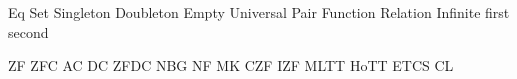 \def\Llam#1#2{\lambda\,{#1}\,.\,{#2}}
\def\Lmac#1{\underline{\mathtt{#1}}}
\def\Lfinto{\rightarrow\mathrel{\kern-.8em}\rightarrow}
\def\Lnum#1{{\underline{#1}}}
\def\lamstep{\mathrel{\;\triangleright_{\kern-.4em}{}_{\phantom{\beta}}\;}}
\def\invstep{\phantom{\lamstep}}
\def\betastep{\mathrel{\;\triangleright_{\kern-.4em{}_\beta}\;}}
\def\etastep{\mathrel{\;\triangleright_{\kern-.4em{}_\eta}\;}}
\def\alphastep{\mathrel{\;\triangleright_{\kern-.4em{}_\alpha}\;}}
\let\lstep=\lamstep
\let\istep=\invstep
\let\bstep=\betastep
\let\estep=\etastep
\let\astep=\alphastep
\def\lameq{\mathrel{\,=\,}}
\def\isteq{\istep\lameq}%
\def\redex#1{\underline{#1}}

\def\C#1{{\mathord{\mathsfmbf{#1}}}}
\def\Cto{\mathrel{\triangleright}}
\def\cI{{\C I}}
\def\cK{{\C K}}
\def\cM{{\C M}}
\def\cC{{\C C}}
\def\cS{{\C S}}
\def\cW{{\C W}}
\def\cB{{\C B}}
\def\cR{{\C R}}
\def\cV{{\C V}}
\def\cBp{{{\C B}'}}

\let\knuthsetminus=\setminus
\def\setminus{\mathbin{\knuthsetminus}}
\def\cantorcard#1{\overline{\overline{#1}}}
\def\cantorset{{\frak C}}
\def\continuum{\euf{c}}
\def\finord#1{\overline{#1}}
\def\eqc{\mathrel{=_{\namedop{c}}}}
\def\neqc{\mathrel{\not\eqc}}
\def\leqc{\mathrel{\leq_{\namedop{c}}}}
\def\geqc{\mathrel{\geq_{\namedop{c}}}}
\def\gtc{\mathrel{>_{\namedop{c}}}}
\def\ltc{\mathrel{<_{\namedop{c}}}}
\def\Univ{{\bbb V}}
\def\complement#1{\widetilde{#1}}
\let\compl=\complement
\def\russell#1{{\mathbf{r}(#1)}}
\def\metain{\mathrel{\in\kern-0.425em\in}}
\let\inclass=\metain
\def\classst#1#2{\pmbb{\{}\;{#1}\;\st \;{#2}\;\pmbb{\}}}
\def\classstt#1#2{\pmbb{\{}\;{#1}\;\st \;{\text{#2}}\;\pmbb{\}}}
\def\classimg#1#2{{#1}{\pmbb[}\,{#2}\,{\pmbb]}}
\let\clsimg=\classimg
\def\universet{{\cal U}}
\DefRel Eq
\DefRel Set
\DefRel Singleton
\DefRel Doubleton
\DefRel Empty
\DefRel Universal
\DefRel Pair
\DefRel Function
\DefRel Relation
\DefRel Infinite
\DefFun first
\DefFun second
\def\kurpair#1#2{\set{\set{#1}, \set{{#1}, {#2}}}}
\def\disjunion{\mathbin{\uplus}}
\def\Disjunion{\mathop{\biguplus}}
\let\dunion=\disjunion
\let\Dunion=\Disjunion
\def\setsucc#1{{#1}{}^+}
\def\kleenestar#1{{#1}^\star}
\def\kleenestarp#1{\paren{#1}^\star}
\let\kstar=\kleenestar
\let\kstarp=\kleenestarp

\DefFou ZF
\DefFou ZFC
\DefFou AC
\DefFou DC
\DefFou ZFDC
\DefFou NBG
\DefFou NF
\DefFou MK
\DefFou CZF
\DefFou IZF
\DefFou MLTT
\DefFou HoTT
\DefFou ETCS
\DefFou CL
\def\ACN{\mathord{\AC}_\nats}

